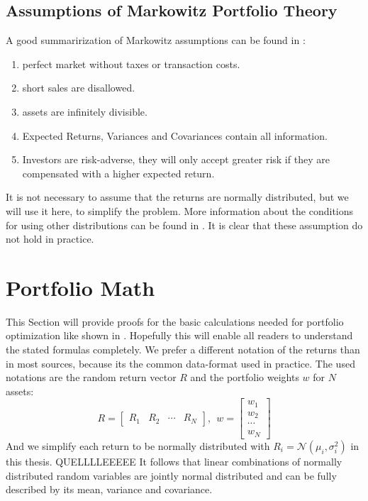 \documentclass[
  oneside]{book}
\begin{document}
\hypertarget{assumptions-of-markowitz-portfolio-theory}{%
\subsection{Assumptions of Markowitz Portfolio Theory}\label{assumptions-of-markowitz-portfolio-theory}}

A good summarirization of Markowitz assumptions can be found in \citep{Mari2005}:

\begin{enumerate}
    \item perfect market without taxes or transaction costs.
    \item short sales are disallowed.
    \item assets are infinitely divisible.
    \item Expected Returns, Variances and Covariances contain all information.
    \item Investors are risk-adverse, they will only accept greater risk if they
are compensated with a higher expected return.
\end{enumerate}

It is not necessary to assume that the returns are normally distributed, but we will use it here, to simplify the problem. More information about the conditions for using other distributions can be found in \citep{Mari2005}. It is clear that these assumption do not hold in practice.

\hypertarget{portfolio-math}{%
\section{Portfolio Math}\label{portfolio-math}}

This Section will provide proofs for the basic calculations needed for portfolio optimization like shown in \citep{Eric2021}. Hopefully this will enable all readers to understand the stated formulas completely. We prefer a different notation of the returns than in most sources, because its the common data-format used in practice. The used notations are the random return vector \(R\) and the portfolio weights \(w\) for \(N\) assets:
\[
  R = 
  \begin{bmatrix}
    R_{1} & R_{2} & \cdots & R_{N}  
 \end{bmatrix}
 , \ \ 
 w = 
  \begin{bmatrix}
    w_{1} \\ 
    w_{2} \\
    \cdots \\
    w_{N}  
 \end{bmatrix}
\]
And we simplify each return to be normally distributed with \(R_i = \mathcal{N}(\mu_i, \sigma_i^2)\) in this thesis. QUELLLLEEEEE It follows that linear combinations of normally distributed random variables are jointly normal distributed and can be fully described by its mean, variance and covariance.
\end{document}
